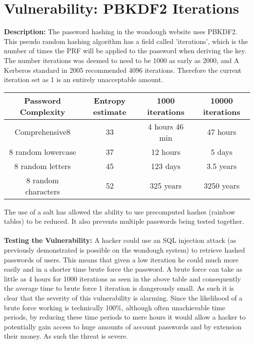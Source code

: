 \section{Vulnerability: PBKDF2 Iterations}
\label{sec:background}
\textbf{Description:} The password hashing in the wondough website uses PBKDF2. This pseudo random hashing algorithm has a field called 'iterations', which is the number of times
the PRF will be applied to the password when deriving the key. The number iterations was deemed to need to be 1000 as early as 2000, and A Kerberos standard in 2005 recommended
4096 iterations. Therefore the current iteration set as 1 is an entirely unacceptable amount\cite{Cyrptosense2015}.\begin{center}
   \begin{tabular}{ |c|c|c|c| }
    \hline
    Password Complexity & Entropy estimate & 1000 iterations &  10000 iterations\\
    \hline
    Comprehensive8 & 33 & 4 hours 46 min & 47 hours \\
    8 random lowercase & 37 & 12 hours & 5 days \\
    8 random letters & 45 & 123 days & 3.5 years \\
    8 random characters & 52 & 325 years & 3250 years \\
    \hline
   \end{tabular}
   \end{center}
The use of a salt has allowed the ability to use precomputed hashes (rainbow tables) to be reduced. It also prevents multiple passwords being tested together. \\ \\
\textbf{Testing the Vulnerability:} A hacker could use an SQL injection attack (as previously demonstrated is possible on the wondough system) to retrieve hashed passwords of
users. This means that given a low iteration he could much more easily and in a shorter time brute force the password. A brute force can take as little as 4 hours for 1000
iterations as seen in the above table and consequently the average time to brute force 1 iteration is dangerously small. As such it is clear that the severity of this vulnerability
is alarming. Since the likelihood of a brute force working is technically 100\%, although often unachievable time periods, by reducing these time periods to mere hours it
would allow a hacker to potentially gain access to huge amounts of account passwords and by extension their money. As such the threat is severe. \\ \\
